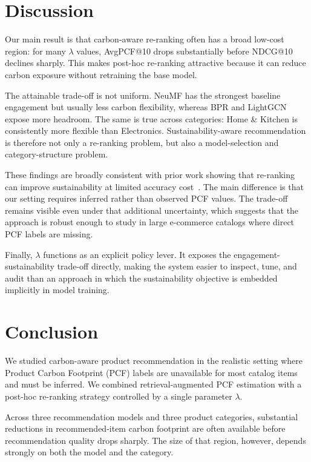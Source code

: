 \documentclass[11pt]{article}
\begin{document}
\section{Discussion}
\label{sec:discussion}

Our main result is that carbon-aware re-ranking often has a broad low-cost region: for many
$\lambda$ values, AvgPCF@10 drops substantially before NDCG@10 declines sharply. This makes
post-hoc re-ranking attractive because it can reduce carbon exposure without retraining the
base model.

The attainable trade-off is not uniform. NeuMF has the strongest baseline engagement but
usually less carbon flexibility, whereas BPR and LightGCN expose more headroom. The same is
true across categories: Home \& Kitchen is consistently more flexible than Electronics.
Sustainability-aware recommendation is therefore not only a re-ranking problem, but also a
model-selection and category-structure problem.

These findings are broadly consistent with prior work showing that re-ranking can improve
sustainability at limited accuracy cost~\cite{kalisvaart2025greenerrec}. The main
difference is that our setting requires inferred rather than observed PCF values. The
trade-off remains visible even under that additional uncertainty, which suggests that the
approach is robust enough to study in large e-commerce catalogs where direct PCF labels are
missing.

Finally, $\lambda$ functions as an explicit policy lever. It exposes the engagement-sustainability trade-off directly, making the system easier to inspect, tune, and audit
than an approach in which the sustainability objective is embedded implicitly in model
training.

\section{Conclusion}
\label{sec:conclusion}

We studied carbon-aware product recommendation in the realistic setting where Product
Carbon Footprint (PCF) labels are unavailable for most catalog items and must be inferred.
We combined retrieval-augmented PCF estimation with a post-hoc re-ranking strategy
controlled by a single parameter $\lambda$.

Across three recommendation models and three product categories, substantial reductions in
recommended-item carbon footprint are often available before recommendation quality drops
sharply. The size of that region, however, depends strongly on both the model and the
category.
\end{document}

